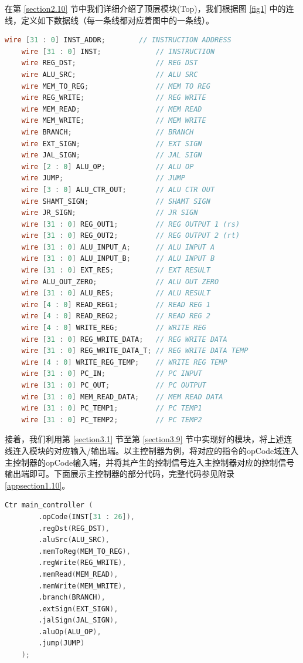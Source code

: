 \documentclass{cumcm}
\numberwithin{equation}{section}
\numberwithin{equation}{subsection}
\begin{document}
在第 \ref{section2.10} 节中我们详细介绍了顶层模块(Top)，我们根据图 \ref{fig1} 中的连线，定义如下数据线（每一条线都对应着图中的一条线）。

\begin{lstlisting}[language=verilog]
    wire [31 : 0] INST_ADDR;        // INSTRUCTION ADDRESS
    wire [31 : 0] INST;             // INSTRUCTION
    wire REG_DST;                   // REG DST
    wire ALU_SRC;                   // ALU SRC
    wire MEM_TO_REG;                // MEM TO REG
    wire REG_WRITE;                 // REG WRITE
    wire MEM_READ;                  // MEM READ
    wire MEM_WRITE;                 // MEM WRITE
    wire BRANCH;                    // BRANCH
    wire EXT_SIGN;                  // EXT SIGN
    wire JAL_SIGN;                  // JAL SIGN
    wire [2 : 0] ALU_OP;            // ALU OP
    wire JUMP;                      // JUMP
    wire [3 : 0] ALU_CTR_OUT;       // ALU CTR OUT
    wire SHAMT_SIGN;                // SHAMT SIGN
    wire JR_SIGN;                   // JR SIGN
    wire [31 : 0] REG_OUT1;         // REG OUTPUT 1 (rs)
    wire [31 : 0] REG_OUT2;         // REG OUTPUT 2 (rt)
    wire [31 : 0] ALU_INPUT_A;      // ALU INPUT A
    wire [31 : 0] ALU_INPUT_B;      // ALU INPUT B
    wire [31 : 0] EXT_RES;          // EXT RESULT
    wire ALU_OUT_ZERO;              // ALU OUT ZERO
    wire [31 : 0] ALU_RES;          // ALU RESULT  
    wire [4 : 0] READ_REG1;         // READ REG 1
    wire [4 : 0] READ_REG2;         // READ REG 2
    wire [4 : 0] WRITE_REG;         // WRITE REG
    wire [31 : 0] REG_WRITE_DATA;   // REG WRITE DATA
    wire [31 : 0] REG_WRITE_DATA_T; // REG WRITE DATA TEMP
    wire [4 : 0] WRITE_REG_TEMP;    // WRITE REG TEMP
    wire [31 : 0] PC_IN;            // PC INPUT
    wire [31 : 0] PC_OUT;           // PC OUTPUT
    wire [31 : 0] MEM_READ_DATA;    // MEM READ DATA
    wire [31 : 0] PC_TEMP1;         // PC TEMP1
    wire [31 : 0] PC_TEMP2;         // PC TEMP2
\end{lstlisting}

接着，我们利用第 \ref{section3.1} 节至第 \ref{section3.9} 节中实现好的模块，将上述连线连入模块的对应输入/输出端。以主控制器为例，将对应的指令的opCode域连入主控制器的opCode输入端，并将其产生的控制信号连入主控制器对应的控制信号输出端即可。下面展示主控制器的部分代码，完整代码参见附录 \ref{appsection1.10}。

\begin{lstlisting}[language=verilog]
    Ctr main_controller (
        .opCode(INST[31 : 26]),
        .regDst(REG_DST),
        .aluSrc(ALU_SRC),
        .memToReg(MEM_TO_REG),
        .regWrite(REG_WRITE),
        .memRead(MEM_READ),
        .memWrite(MEM_WRITE),
        .branch(BRANCH),
        .extSign(EXT_SIGN),
        .jalSign(JAL_SIGN),
        .aluOp(ALU_OP),
        .jump(JUMP)
    );
\end{lstlisting}
\end{document}
